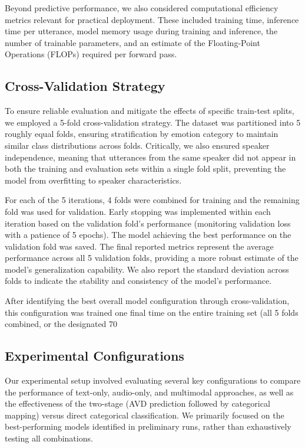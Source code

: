 \documentclass[12pt]{article}
\begin{document}
Beyond predictive performance, we also considered computational efficiency metrics relevant for practical deployment. These included training time, inference time per utterance, model memory usage during training and inference, the number of trainable parameters, and an estimate of the Floating-Point Operations (FLOPs) required per forward pass.

\subsection{Cross-Validation Strategy}
To ensure reliable evaluation and mitigate the effects of specific train-test splits, we employed a 5-fold cross-validation strategy. The dataset was partitioned into 5 roughly equal folds, ensuring stratification by emotion category to maintain similar class distributions across folds. Critically, we also ensured speaker independence, meaning that utterances from the same speaker did not appear in both the training and evaluation sets within a single fold split, preventing the model from overfitting to speaker characteristics.

For each of the 5 iterations, 4 folds were combined for training and the remaining fold was used for validation. Early stopping was implemented within each iteration based on the validation fold's performance (monitoring validation loss with a patience of 5 epochs). The model achieving the best performance on the validation fold was saved. The final reported metrics represent the average performance across all 5 validation folds, providing a more robust estimate of the model's generalization capability. We also report the standard deviation across folds to indicate the stability and consistency of the model's performance.

After identifying the best overall model configuration through cross-validation, this configuration was trained one final time on the entire training set (all 5 folds combined, or the designated 70%

\subsection{Experimental Configurations}
Our experimental setup involved evaluating several key configurations to compare the performance of text-only, audio-only, and multimodal approaches, as well as the effectiveness of the two-stage (AVD prediction followed by categorical mapping) versus direct categorical classification. We primarily focused on the best-performing models identified in preliminary runs, rather than exhaustively testing all combinations.
\end{document}
